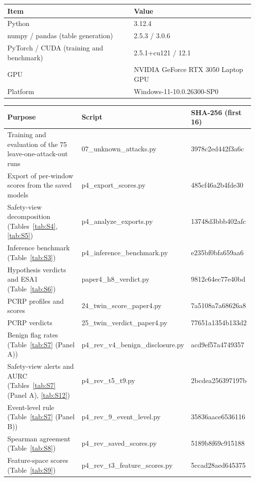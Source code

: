 \documentclass[10pt,a4paper]{article}
\begin{document}
\begin{center}\small
\begin{tabular}{p{6.2cm}p{7cm}}
\toprule
Item & Value \\
\midrule
Python & 3.12.4 \\
numpy / pandas (table generation) & 2.5.3 / 3.0.6 \\
PyTorch / CUDA (training and benchmark) & 2.5.1+cu121 / 12.1 \\
GPU & NVIDIA GeForce RTX 3050 Laptop GPU \\
Platform & Windows-11-10.0.26300-SP0 \\
\bottomrule
\end{tabular}
\end{center}

\begin{center}\footnotesize
\begin{tabular}{p{4.9cm}p{6.6cm}l}
\toprule
Purpose & Script & SHA-256 (first 16) \\
\midrule
Training and evaluation of the 75 leave-one-attack-out runs & 07\_unknown\_attacks.py & 3978c2ed442f3a6c \\
Export of per-window scores from the saved models & p4\_export\_scores.py & 485cf46a2b4fde30 \\
Safety-view decomposition (Tables~\ref{tab:S4}, \ref{tab:S5}) & p4\_analyze\_exports.py & 13748d3bbb402afc \\
Inference benchmark (Table~\ref{tab:S3}) & p4\_inference\_benchmark.py & e235bf0bfa659aa6 \\
Hypothesis verdicts and ESA1 (Table~\ref{tab:S6}) & paper4\_h8\_verdict.py & 9812c64ec77e40bd \\
PCRP profiles and scores & 24\_twin\_score\_paper4.py & 7a5108a7a68626a8 \\
PCRP verdicts & 25\_twin\_verdict\_paper4.py & 77651a1354b133d2 \\
Benign flag rates (Table~\ref{tab:S7} (Panel A)) & p4\_rev\_v4\_benign\_disclosure.py & acd9ef57a4749357 \\
Safety-view alerts and AURC (Tables~\ref{tab:S7} (Panel A), \ref{tab:S12}) & p4\_rev\_t5\_t9.py & 2bcdea256397197b \\
Event-level rule (Table~\ref{tab:S7} (Panel B)) & p4\_rev\_9\_event\_level.py & 35836aace6536116 \\
Spearman agreement (Table~\ref{tab:S8}) & p4\_rev\_saved\_scores.py & 5189b8f69c915188 \\
Feature-space scores (Table~\ref{tab:S9}) & p4\_rev\_t3\_feature\_scores.py & 5ccad28aed645375 \\

\end{tabular}
\end{center}
\end{document}
